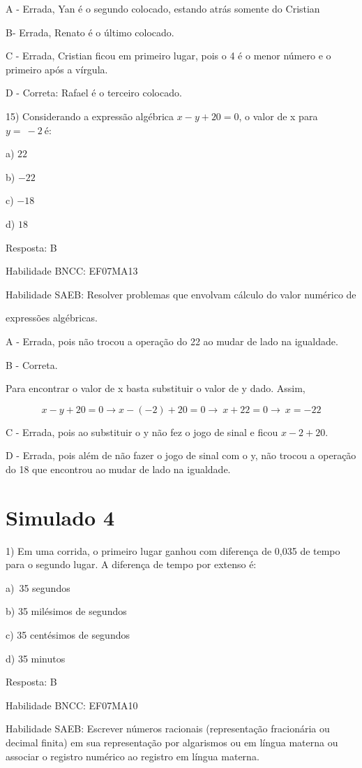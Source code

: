A - Errada, Yan é o segundo colocado, estando atrás somente do Cristian

B- Errada, Renato é o último colocado.

C - Errada, Cristian ficou em primeiro lugar, pois o 4 é o menor número
e o primeiro após a vírgula.

D - Correta: Rafael é o terceiro colocado.

15) Considerando a expressão algébrica \(x - y + 20 = 0\), o valor de x
para \(y = \  - 2\ \)é:

a) \(22\)

b) \(- 22\)

c) \(- 18\)

d) \(18\)

Resposta: B

Habilidade BNCC: EF07MA13

Habilidade SAEB: Resolver problemas que envolvam cálculo do valor
numérico de

expressões algébricas.

A - Errada, pois não trocou a operação do 22 ao mudar de lado na
igualdade.

B - Correta.

Para encontrar o valor de x basta substituir o valor de y dado. Assim,

\[x - y + 20 = 0 \rightarrow x - ( - 2) + 20 = 0 \rightarrow \ x + 22 = 0 \rightarrow \ x = - 22\]

C - Errada, pois ao substituir o y não fez o jogo de sinal e ficou
\(x - 2 + 20\).

D - Errada, pois além de não fazer o jogo de sinal com o y, não trocou a
operação do 18 que encontrou ao mudar de lado na igualdade.

\section{Simulado 4}

1) Em uma corrida, o primeiro lugar ganhou com diferença de 0,035 de
tempo para o segundo lugar. A diferença de tempo por extenso é:

a)~35 segundos

b) 35 milésimos de segundos

c) 35 centésimos de segundos~

d) 35 minutos

Resposta: B~

Habilidade BNCC: EF07MA10

Habilidade SAEB: Escrever números racionais (representação fracionária
ou decimal finita) em sua representação por algarismos ou em língua
materna ou associar o registro numérico ao registro em língua materna.

